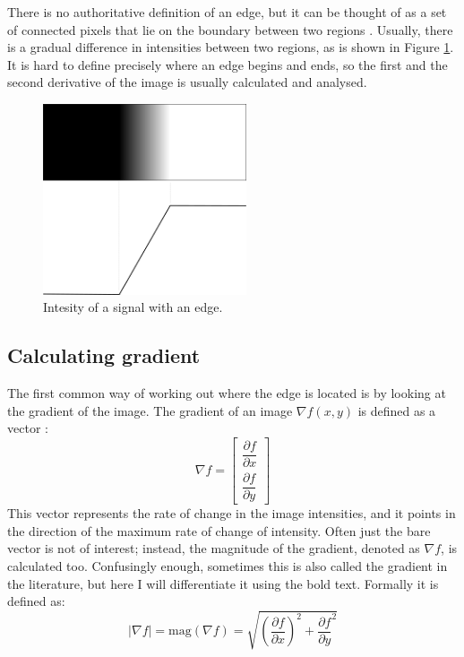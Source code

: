 \documentclass[
  digital,     %
  oneside,     %
  nosansbold,  %
  nocolorbold, %
  lof,         %
  lot,         %
]{fithesis4}
\begin{document}
There is no authoritative definition of an edge, but it can be thought of as a
set of connected pixels that lie on the boundary between two regions
\cite{gonzalez2002}. Usually, there is a gradual difference in intensities
between two regions, as is shown in Figure \ref{fig:edge_intensities}. It is
hard to define precisely where an edge begins and ends, so the first and the
second derivative of the image is usually calculated and analysed.


\begin{figure}
    \begin{center}
        \includegraphics[width=6cm]{resources/inkscape/gradient.png}
    \end{center}
    \caption{Intesity of a signal with an edge.}
    \label{fig:edge_intensities}
\end{figure}

\subsection{Calculating gradient}

The first common way of working out where the edge is located is by looking at
the gradient of the image. The gradient of an image $\nabla f(x,y)$ is defined
as a vector \cite{gonzalez2002}:
$$\nabla f =
\begin{bmatrix}
    \dfrac{\partial f}{\partial x}\\[2ex]
    \dfrac{\partial f}{\partial y}
\end{bmatrix}$$
This vector represents the rate of change in the image intensities, and it points in
the direction of the maximum rate of change of intensity. Often just the bare
vector is not of interest; instead, the magnitude of the gradient, denoted as
$\nabla f$, is calculated too. Confusingly enough, sometimes this is also called
the gradient in the literature, but here I will differentiate it using the bold
text. Formally it is defined as:
$$|\nabla f| = \text{mag}(\nabla f) = \sqrt{(\frac{\partial f}{\partial x})^2 +
\frac{\partial f}{\partial y}^2}$$
\end{document}
